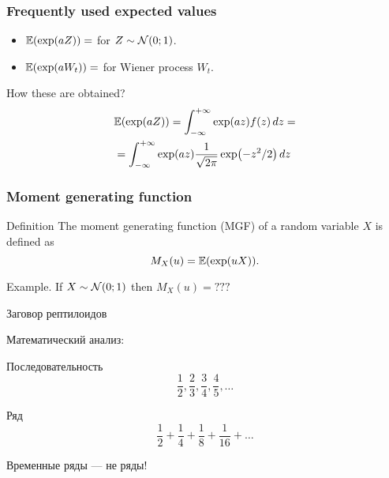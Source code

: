 \begin{frame}
  \frametitle{Frequently used expected values}

  \begin{itemize}
    \item $\mathbb{E}(\exp(aZ)) = $ for $Z \sim \mathcal{N}(0;1)$.
    \item $\mathbb{E}(\exp(aW_t)) = $ for Wiener process $W_t$.
  \end{itemize}
  
  \begin{block}{How these are obtained?}
    \begin{align*}
      &\mathbb{E}(\exp(aZ)) = \int_{-\infty}^{+\infty} \exp(az) f(z) \,dz = \\
      & = \int_{-\infty}^{+\infty} \exp(az) \frac{1}{\sqrt{2\pi}}\exp(-z^2/2) \,dz
    \end{align*}
  \end{block}

\end{frame}


\begin{frame}
  \frametitle{Moment generating function}

\begin{block}{Definition}
    The \alert{moment generating function} (MGF) of a random variable $X$ is defined as 
  \[
  M_X(u) = \mathbb{E}(\exp(u X)).
  \] 
\end{block}

\pause 

Example. If $X\sim \mathcal{N}(0;1)$ then $M_X(u) = ???$
  
\end{frame}


\begin{frame}{Заговор рептилоидов}

  \alert{Математический анализ:}

  \begin{block}{Последовательность}
    \[
      \frac{1}{2}, \frac{2}{3}, \frac{3}{4}, \frac{4}{5}, \ldots
    \]
  \end{block}
  
  \pause

  \begin{block}{Ряд}
    \[
      \frac{1}{2} + \frac{1}{4} + \frac{1}{8} +  \frac{1}{16} + \ldots
    \]
  \end{block}
  
  \pause

  Временные ряды — \alert{не ряды!}
\end{frame}
  



